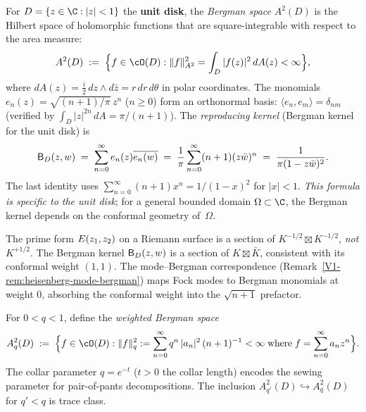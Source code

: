 \begin{definition}%
%
For $D = \{z \in \C : |z| < 1\}$ the \textbf{unit disk},
the \emph{Bergman space} $A^2(D)$ is the Hilbert space of
holomorphic functions that are square-integrable with respect
to the area measure:
\begin{equation}%
A^2(D)
\;:=\;
\Bigl\{f \in \cO(D) : \|f\|^2_{A^2}
= \int_D |f(z)|^2\,dA(z) < \infty\Bigr\},
\end{equation}
where $dA(z) = \frac{i}{2}\,dz \wedge d\bar{z}
= r\,dr\,d\theta$ in polar coordinates. The monomials
$e_n(z) = \sqrt{(n+1)/\pi}\, z^n$ ($n \geq 0$)
form an orthonormal basis:
$\langle e_n, e_m\rangle = \delta_{nm}$ (verified by
$\int_D |z|^{2n}\,dA = \pi/(n+1)$). The
\emph{reproducing kernel} (Bergman kernel for the unit
disk) is
\begin{equation}%
\Bergker_D(z,w)
\;=\;
\sum_{n=0}^{\infty} e_n(z)\overline{e_n(w)}
\;=\;
\frac{1}{\pi}\sum_{n=0}^{\infty}(n+1)(z\bar{w})^n
\;=\;
\frac{1}{\pi(1 - z\bar{w})^2}.
\end{equation}
The last identity uses $\sum_{n=0}^{\infty}(n+1)x^n
= 1/(1-x)^2$ for $|x| < 1$. \emph{This formula is
specific to the unit disk}; for a general bounded domain
$\Omega \subset \C$, the Bergman kernel depends on the
conformal geometry of~$\Omega$.
\end{definition}

\begin{remark}%
The prime form $E(z_1,z_2)$ on a Riemann surface is a section
of $K^{-1/2} \boxtimes K^{-1/2}$, \emph{not} $K^{+1/2}$.
The Bergman kernel
$\mathsf{B}_D(z,w)$ is a section of $K \boxtimes \bar{K}$, consistent
with its conformal weight $(1,1)$. The mode--Bergman correspondence
(Remark~\ref{V1-rem:heisenberg-mode-bergman}) maps Fock modes to
Bergman monomials at weight $0$, absorbing the conformal weight
into the $\sqrt{n+1}$ prefactor.
\end{remark}

\begin{definition}%
%
For $0 < q < 1$, define the \emph{weighted Bergman space}
\begin{equation}%
A^2_q(D)
\;:=\;
\Bigl\{f \in \cO(D) :
\|f\|^2_{q} := \sum_{n=0}^{\infty}
q^n \,|a_n|^2 \,(n+1)^{-1} < \infty
\;\text{where}\; f = \sum_{n=0}^{\infty} a_n z^n\Bigr\}.
\end{equation}
The collar parameter $q = e^{-t}$ ($t > 0$ the collar length)
encodes the sewing parameter for pair-of-pants decompositions.
The inclusion $A^2_{q'}(D) \hookrightarrow A^2_q(D)$ for $q' < q$
is trace class.
\end{definition}

